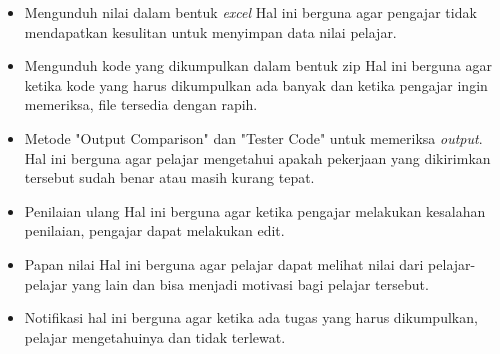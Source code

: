 \begin{itemize}
    \item Mengunduh nilai dalam bentuk \textit{excel}\newline
    Hal ini berguna agar pengajar tidak mendapatkan kesulitan untuk menyimpan data nilai pelajar.\\
    
    \item Mengunduh kode yang dikumpulkan dalam bentuk zip \newline
    Hal ini berguna agar ketika kode yang harus dikumpulkan ada banyak dan ketika pengajar ingin memeriksa, file tersedia dengan rapih. \\
    
    \item Metode "Output Comparison" dan "Tester Code" untuk memeriksa \textit{output}. \newline
    Hal ini berguna agar pelajar mengetahui apakah pekerjaan yang dikirimkan tersebut sudah benar atau masih kurang tepat. \\
    
    \item Penilaian ulang \newline
    Hal ini berguna agar ketika pengajar melakukan kesalahan penilaian, pengajar dapat melakukan edit. \\
    \item Papan nilai\newline
    Hal ini berguna agar pelajar dapat melihat nilai dari pelajar-pelajar yang lain dan bisa menjadi motivasi bagi pelajar tersebut. \\
    \item Notifikasi \newline
    hal ini berguna agar ketika ada tugas yang harus dikumpulkan, pelajar mengetahuinya dan tidak terlewat.
\end{itemize}

